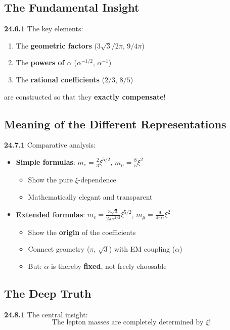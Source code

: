 \documentclass[12pt,a4paper]{article}
\begin{document}
\subsection{The Fundamental Insight}

\noindent \textbf{24.6.1} The key elements:
\begin{enumerate}
	\item The \textbf{geometric factors} ($3\sqrt{3}/2\pi$, $9/4\pi$)
	\item The \textbf{powers of $\alpha$} ($\alpha^{-1/2}$, $\alpha^{-1}$)  
	\item The \textbf{rational coefficients} ($2/3$, $8/5$)
\end{enumerate}

\noindent are constructed so that they \textbf{exactly compensate}!

\subsection{Meaning of the Different Representations}

\noindent \textbf{24.7.1} Comparative analysis:
\begin{itemize}
	\item \textbf{Simple formulas}: $m_e = \frac{2}{3}\xi^{5/2}$, $m_\mu = \frac{8}{5}\xi^2$
	\begin{itemize}
		\item Show the pure $\xi$-dependence
		\item Mathematically elegant and transparent
	\end{itemize}
	
	\item \textbf{Extended formulas}: $m_e = \frac{3\sqrt{3}}{2\pi\alpha^{1/2}}\xi^{5/2}$, $m_\mu = \frac{9}{4\pi\alpha}\xi^2$
	\begin{itemize}
		\item Show the \textbf{origin} of the coefficients
		\item Connect geometry ($\pi$, $\sqrt{3}$) with EM coupling ($\alpha$)
		\item But: $\alpha$ is thereby \textbf{fixed}, not freely choosable
	\end{itemize}
\end{itemize}

\subsection{The Deep Truth}

\noindent \textbf{24.8.1} The central insight:
\[
\boxed{
	\text{The lepton masses are completely determined by } \xi \text{!}
}
\]
\end{document}
